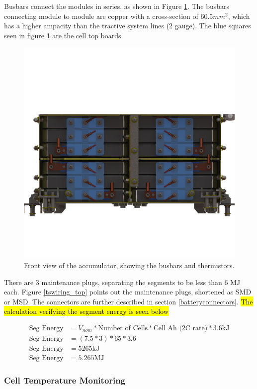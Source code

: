 \documentclass{article}
\DeclareRobustCommand{\hlr}[1]{{\sethlcolor{red}\hl{#1}}}
\begin{document}
            Busbars connect the modules in series, as shown in Figure \ref{busbar}. The busbars connecting module to module are copper with a cross-section of $60.5 mm^2$, which has a higher ampacity than the tractive system lines (2 gauge). The blue squares seen in figure \ref{busbar} are the cell top boards.

            \begin{figure}[H]
                \centering
                \includegraphics[width = 0.6 \textwidth]{bus-bar_configuration}
                \caption{Front view of the accumulator, showing the busbars and thermistors. }
                \label{busbar}
            \end{figure}

            There are 3 maintenance plugs, separating the segments to be less than 6 MJ each. Figure \ref{tswiring_top}  points out the maintenance plugs, shortened as SMD or MSD. The connectors are further described in section \ref{batteryconnectors}. \hlr{The calculation verifying the segment energy is seen below}

            \begin{align}
              \text{Seg Energy} &= V_{nom}  * \text{Number of Cells} * \text{Cell Ah (2C rate)} *  3.6 \text{kJ}\\
              \text{Seg Energy} &= (7.5*3 ) * 65 * 3.6 \\
              \text{Seg Energy} &= 5265 \text{kJ}\\
              \text{Seg Energy} &= 5.265 \text{MJ}
            \end{align}

        \subsubsection{Cell Temperature Monitoring} %
\end{document}
